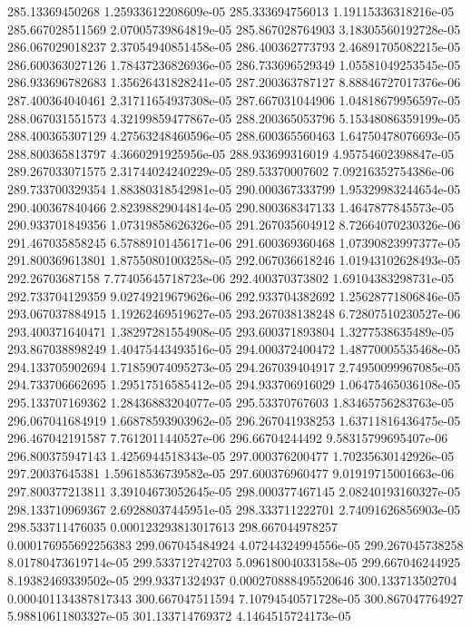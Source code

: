 {285.13369450268 1.25933612208609e-05
285.333694756013 1.19115336318216e-05
285.667028511569 2.07005739864819e-05
285.867028764903 3.18305560192728e-05
286.067029018237 2.37054940851458e-05
286.400362773793 2.46891705082215e-05
286.600363027126 1.78437236826936e-05
286.733696529349 1.05581049253545e-05
286.933696782683 1.35626431828241e-05
287.200363787127 8.88846727017376e-06
287.400364040461 2.31711654937308e-05
287.667031044906 1.04818679956597e-05
288.067031551573 4.32199859477867e-05
288.200365053796 5.15348086359199e-05
288.400365307129 4.27563248460596e-05
288.600365560463 1.64750478076693e-05
288.800365813797 4.3660291925956e-05
288.933699316019 4.95754602398847e-05
289.267033071575 2.31744024240229e-05
289.53370007602 7.09216352754386e-06
289.733700329354 1.88380318542981e-05
290.000367333799 1.95329983244654e-05
290.400367840466 2.82398829044814e-05
290.800368347133 1.4647877845573e-05
290.933701849356 1.07319858626326e-05
291.267035604912 8.72664070230326e-06
291.467035858245 6.57889101456171e-06
291.600369360468 1.07390823997377e-05
291.800369613801 1.87550801003258e-05
292.067036618246 1.01943102628493e-05
292.26703687158 7.77405645718723e-06
292.400370373802 1.69104383298731e-05
292.733704129359 9.02749219679626e-06
292.933704382692 1.25628771806846e-05
293.067037884915 1.19262469519627e-05
293.267038138248 6.72807510230527e-06
293.400371640471 1.38297281554908e-05
293.600371893804 1.3277538635489e-05
293.867038898249 1.40475443493516e-05
294.000372400472 1.48770005535468e-05
294.133705902694 1.71859074095273e-05
294.267039404917 2.74950099967085e-05
294.733706662695 1.29517516585412e-05
294.933706916029 1.06475465036108e-05
295.133707169362 1.28436883204077e-05
295.53370767603 1.83465756283763e-05
296.067041684919 1.66878593903962e-05
296.267041938253 1.63711816436475e-05
296.467042191587 7.7612011440527e-06
296.66704244492 9.58315799695407e-06
296.800375947143 1.4256944518343e-05
297.000376200477 1.70235630142926e-05
297.20037645381 1.59618536739582e-05
297.600376960477 9.01919715001663e-06
297.800377213811 3.39104673052645e-05
298.000377467145 2.08240193160327e-05
298.133710969367 2.69288037445951e-05
298.333711222701 2.74091626856903e-05
298.533711476035 0.000123293813017613
298.667044978257 0.000176955692256383
299.067045484924 4.07244324994556e-05
299.267045738258 8.01780473619714e-05
299.533712742703 5.09618004033158e-05
299.667046244925 8.19382469339502e-05
299.93371324937 0.000270888495520646
300.133713502704 0.000401134387817343
300.667047511594 7.10794540571728e-05
300.867047764927 5.98810611803327e-05
301.133714769372 4.1464515724173e-05
}
